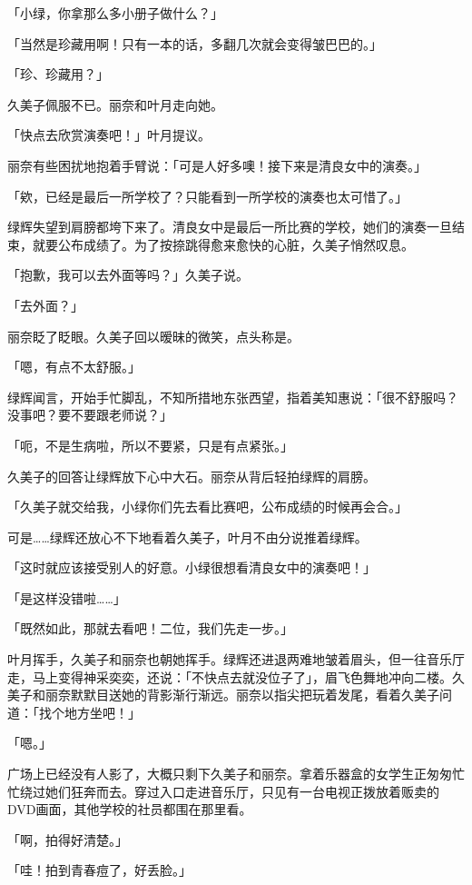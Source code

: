 \documentclass[UTF8]{ctexart}
\begin{document}
    「小绿，你拿那么多小册子做什么？」 

    「当然是珍藏用啊！只有一本的话，多翻几次就会变得皱巴巴的。」 

    「珍、珍藏用？」 

    久美子佩服不已。丽奈和叶月走向她。 

    「快点去欣赏演奏吧！」叶月提议。 

    丽奈有些困扰地抱着手臂说：「可是人好多噢！接下来是清良女中的演奏。」 

    「欸，已经是最后一所学校了？只能看到一所学校的演奏也太可惜了。」 

    绿辉失望到肩膀都垮下来了。清良女中是最后一所比赛的学校，她们的演奏一旦结束，就要公布成绩了。为了按捺跳得愈来愈快的心脏，久美子悄然叹息。 

    「抱歉，我可以去外面等吗？」久美子说。 

    「去外面？」 

    丽奈眨了眨眼。久美子回以暧昧的微笑，点头称是。 

    「嗯，有点不太舒服。」 

    绿辉闻言，开始手忙脚乱，不知所措地东张西望，指着美知惠说：「很不舒服吗？没事吧？要不要跟老师说？」 

    「呃，不是生病啦，所以不要紧，只是有点紧张。」 

    久美子的回答让绿辉放下心中大石。丽奈从背后轻拍绿辉的肩膀。 

    「久美子就交给我，小绿你们先去看比赛吧，公布成绩的时候再会合。」 

    可是……绿辉还放心不下地看着久美子，叶月不由分说推着绿辉。 

    「这时就应该接受别人的好意。小绿很想看清良女中的演奏吧！」 

    「是这样没错啦……」 

    「既然如此，那就去看吧！二位，我们先走一步。」 

    叶月挥手，久美子和丽奈也朝她挥手。绿辉还进退两难地皱着眉头，但一往音乐厅走，马上变得神采奕奕，还说：「不快点去就没位子了」，眉飞色舞地冲向二楼。久美子和丽奈默默目送她的背影渐行渐远。丽奈以指尖把玩着发尾，看着久美子问道：「找个地方坐吧！」 

    「嗯。」 

    广场上已经没有人影了，大概只剩下久美子和丽奈。拿着乐器盒的女学生正匆匆忙忙绕过她们狂奔而去。穿过入口走进音乐厅，只见有一台电视正拨放着贩卖的DVD画面，其他学校的社员都围在那里看。 

    「啊，拍得好清楚。」 

    「哇！拍到青春痘了，好丢脸。」 
\end{document}
